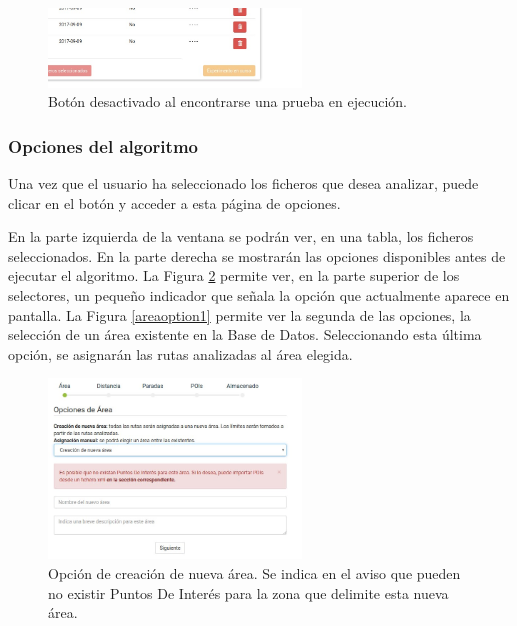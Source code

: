 \begin{figure}[h]
  \centering
    \includegraphics[width=0.6\textwidth]{../img/manualusuario/pruebaeje.jpg}
  \caption{Botón desactivado al encontrarse una prueba en ejecución.}
  \label{pruebaeje}
\end{figure}

\subsubsection{Opciones del algoritmo}
Una vez que el usuario ha seleccionado los ficheros que desea analizar, puede clicar en el botón  y acceder a esta página de opciones.

En la parte izquierda de la ventana se podrán ver, en una tabla, los ficheros seleccionados. En la parte derecha se mostrarán las opciones disponibles antes de ejecutar el algoritmo. La Figura \ref{areaoption} permite ver, en la parte superior de los selectores, un pequeño indicador que señala la opción que actualmente aparece en pantalla. La Figura \ref{areaoption1} permite ver la segunda de las opciones, la selección de un área existente en la Base de Datos. Seleccionando esta última opción, se asignarán las rutas analizadas al área elegida.

\begin{figure}[h]
  \centering
    \includegraphics[width=0.6\textwidth]{../img/manualusuario/areaoption.jpg}
  \caption{Opción de creación de nueva área. Se indica en el aviso que pueden no existir Puntos De Interés para la zona que delimite esta nueva área.}
  \label{areaoption}
\end{figure}

